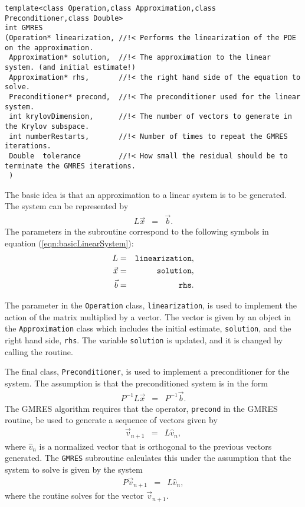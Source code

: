 \begin{lstlisting}[caption={The definition for the GMRES routine.},
                   basicstyle=\scriptsize,
                   label=listing:GMRESDefinition]
template<class Operation,class Approximation,class Preconditioner,class Double>
int GMRES
(Operation* linearization, //!< Performs the linearization of the PDE on the approximation.
 Approximation* solution,  //!< The approximation to the linear system. (and initial estimate!)
 Approximation* rhs,       //!< the right hand side of the equation to solve.
 Preconditioner* precond,  //!< The preconditioner used for the linear system.
 int krylovDimension,      //!< The number of vectors to generate in the Krylov subspace.
 int numberRestarts,       //!< Number of times to repeat the GMRES iterations.
 Double  tolerance         //!< How small the residual should be to terminate the GMRES iterations.
 )
\end{lstlisting}

The basic idea is that an approximation to a linear system is to be
generated. The system can be represented by
\begin{eqnarray}
  \label{eqn:basicLinearSystem}
  L \vec{x} & = & \vec{b}.
\end{eqnarray}
The parameters in the subroutine correspond to the following symbols
in equation (\ref{eqn:basicLinearSystem}):
\begin{eqnarray*}
  L & = & {\tt linearization}, \\
  \vec{x} & = & {\tt solution}, \\
  \vec{b} & = & {\tt rhs}.
\end{eqnarray*}

The parameter in the {\tt Operation} class, {\tt linearization}, is
used to implement the action of the matrix multiplied by a vector. The
vector is given by an object in the {\tt Approximation} class which
includes the initial estimate, {\tt solution}, and the right hand
side, {\tt rhs}. The variable {\tt solution} is updated, and it is
changed by calling the routine. 

The final class, {\tt Preconditioner}, is used to implement a
preconditioner for the system. The assumption is that the
preconditioned system is in the form
\begin{eqnarray*}
  P^{-1} L \vec{x} & = & P^{-1} \vec{b}.
\end{eqnarray*}
The GMRES algorithm requires that the operator, {\tt precond} in the
GMRES routine, be used to generate a sequence of vectors given by
\begin{eqnarray*}
  \vec{v}_{n+1} & = & L \hat{v}_n,
\end{eqnarray*}
where $\hat{v}_n$ is a normalized vector that is orthogonal to the
previous vectors generated. The {\tt GMRES} subroutine calculates this
under the assumption that the system to solve is given by the system
\begin{eqnarray}
  \label{eqn:preconditionerSolver}
  P \vec{v}_{n+1} & = & L \hat{v}_n,
\end{eqnarray}
where the routine solves for the vector $\vec{v}_{n+1}$.


